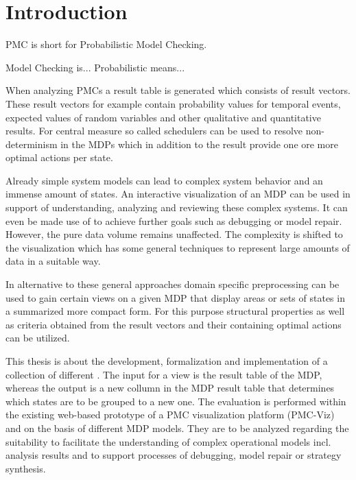 \documentclass[preview]{standalone}
\begin{document}
	\section{Introduction}
	PMC is short for Probabilistic Model Checking.
	
	Model Checking is...
	Probabilistic means...
	
	When analyzing PMCs a result table is generated which consists of result vectors. These result vectors for example contain probability values for temporal events, expected values of random variables and other qualitative and quantitative results. For central measure so called schedulers can be used to resolve non-determinism in the MDPs which in addition to the result provide one ore more optimal actions per state.
	
	Already simple system models can lead to complex system behavior and an immense amount of states. An interactive visualization of an MDP can be used in support of understanding, analyzing and reviewing these complex systems. It can even be made use of to achieve further goals such as debugging or model repair. However, the pure data volume remains unaffected. The complexity is shifted to the visualization which has some general techniques to represent large amounts of data in a suitable way.
	
	
	In alternative to these general approaches domain specific preprocessing can be used to gain certain views on a given MDP that display areas or sets of states in a summarized more compact form. For this purpose structural properties as well as criteria obtained from the result vectors and their containing optimal actions can be utilized.
	
	
	This thesis is about the development, formalization and implementation of a collection of different \emph{\viewsN}.
	The input for a view is the result table of the MDP, whereas the output is a new collumn in the MDP result table that determines which states are to be grouped to a new one.
	The evaluation is performed within the existing web-based prototype of a PMC visualization platform (PMC-Viz) and on the basis of different MDP models. They are to be analyzed regarding the suitability to facilitate the understanding of complex operational models incl. analysis results and to support processes of debugging, model repair or strategy synthesis.
\end{document}
